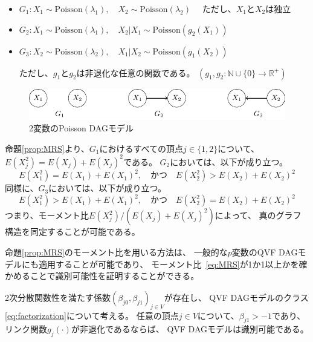 \begin{itemize}
  \item $G_1 \colon X_1 \sim \mathrm{Poisson}(\lambda_1),
         \quad X_2 \sim \mathrm{Poisson}(\lambda_2) \quad$ ただし、$X_1$と$X_2$は独立

  \item $G_2 \colon X_1 \sim \mathrm{Poisson}(\lambda_1),
         \quad X_2|X_1 \sim \mathrm{Poisson}(g_2(X_1))$

  \item $G_3 \colon X_2 \sim \mathrm{Poisson}(\lambda_2),
         \quad X_1|X_2 \sim \mathrm{Poisson}(g_1(X_2))$

  ただし、$g_1$と$g_2$は非退化な任意の関数である。
  $(g_1, g_2 \colon \mathbb{N} \cup \{ 0 \} \rightarrow \mathbb{R}^+)$
\end{itemize}

\begin{figure}[h]
  \centering
  \includegraphics{./picture/bivariate.pdf}
  \caption{2変数のPoisson DAGモデル}
  \label{fig:ex_bivariate}
\end{figure}

命題\ref{prop:MRS}より、$G_1$におけるすべての頂点$j \in \{ 1,2 \}$について、
$E(X_j^2) = E(X_j) + E(X_j)^2$である。
$G_2$においては、以下が成り立つ。
\begin{equation*}
  E(X_1^2) = E(X_1) + E(X_1)^2, \quad \text{かつ} \quad
  E(X_2^2) > E(X_2) + E(X_2)^2
\end{equation*}
同様に、$G_3$においては、以下が成り立つ。
\begin{equation*}
  E(X_1^2) > E(X_1) + E(X_1)^2, \quad \text{かつ} \quad
  E(X_2^2) = E(X_2) + E(X_2)^2
\end{equation*}
つまり、モーメント比$E(X_j^2) / (E(X_j) + E(X_j)^2)$によって、
真のグラフ構造を同定することが可能である。

命題\ref{prop:MRS}のモーメント比を用いる方法は、
一般的な$p$変数のQVF DAGモデルにも適用することが可能であり、
モーメント比~\eqref{eq:MRS}が1か1以上かを確かめることで識別可能性を証明することができる。

\begin{theo}
  2次分散関数性を満たす係数$(\beta_{j0}, \beta_{j1})_{j \in V}$が存在し、
  QVF DAGモデルのクラス\eqref{eq:factorization}について考える。
  任意の頂点$j \in V$について、$\beta_{j1} > -1$であり、
  リンク関数$g_j(\cdot)$が非退化であるならば、
  QVF DAGモデルは識別可能である。
\end{theo}

